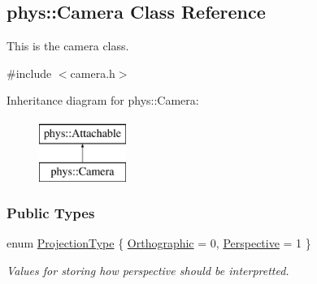 \hypertarget{classphys_1_1Camera}{
\subsection{phys::Camera Class Reference}
\label{d9/df8/classphys_1_1Camera}
}


This is the camera class.  




{\ttfamily \#include $<$camera.h$>$}

Inheritance diagram for phys::Camera:\begin{figure}[H]
\begin{center}
\leavevmode
\includegraphics[height=2.000000cm]{d9/df8/classphys_1_1Camera}
\end{center}
\end{figure}
\subsubsection*{Public Types}
\begin{DoxyCompactItemize}
\item 
enum \hyperlink{classphys_1_1Camera_a87d8d46e9eb2080b10712079be69d86a}{ProjectionType} \{ \hyperlink{classphys_1_1Camera_a87d8d46e9eb2080b10712079be69d86aa6a71e6ab2139c8fc4d48d64aa9717f02}{Orthographic} =  0, 
\hyperlink{classphys_1_1Camera_a87d8d46e9eb2080b10712079be69d86aacfe21986c8c655b8d19ebd76118de055}{Perspective} =  1
 \}
\begin{DoxyCompactList}\small\item\em Values for storing how perspective should be interpretted. \item\end{DoxyCompactList}\end{DoxyCompactItemize}

